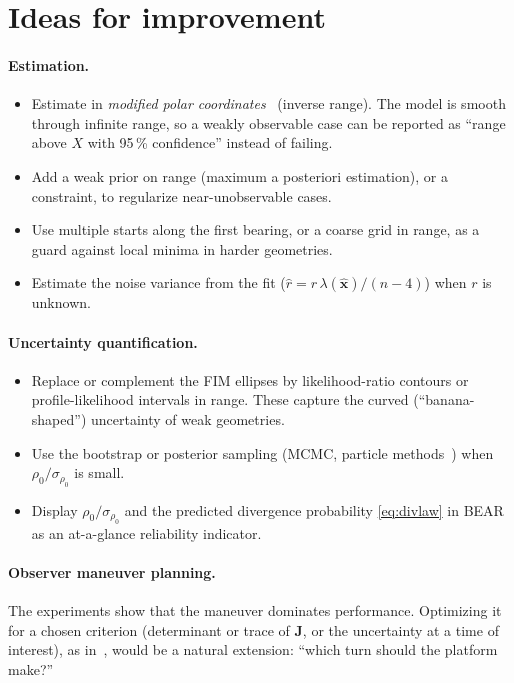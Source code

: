 \documentclass[11pt,a4paper]{article}
\newcommand{\xh}{\hat{\bm{x}}}
\newcommand{\J}{\bm{J}}
\theoremstyle{plain}
\theoremstyle{remark}
\begin{document}
\section{Ideas for improvement}
\label{sec:improvements}

\paragraph{Estimation.}
\begin{itemize}[nosep]
\item Estimate in \emph{modified polar coordinates}~\cite{aidala83} (inverse
  range). The model is smooth through infinite range, so a weakly observable
  case can be reported as ``range above $X$ with 95\,\% confidence'' instead
  of failing.
\item Add a weak prior on range (maximum a posteriori estimation), or a
  constraint, to regularize near-unobservable cases.
\item Use multiple starts along the first bearing, or a coarse grid in range,
  as a guard against local minima in harder geometries.
\item Estimate the noise variance from the fit
  ($\hat r = r\,\lambda(\xh)/(n-4)$) when $r$ is unknown.
\end{itemize}

\paragraph{Uncertainty quantification.}
\begin{itemize}[nosep]
\item Replace or complement the FIM ellipses by likelihood-ratio contours or
  profile-likelihood intervals in range. These capture the curved
  (``banana-shaped'') uncertainty of weak geometries.
\item Use the bootstrap or posterior sampling (MCMC, particle
  methods~\cite{ristic04}) when $\rho_0/\sigma_{\rho_0}$ is small.
\item Display $\rho_0/\sigma_{\rho_0}$ and the predicted divergence probability
  \cref{eq:divlaw} in BEAR as an at-a-glance reliability indicator.
\end{itemize}

\paragraph{Observer maneuver planning.} The experiments show that the
maneuver dominates performance. Optimizing it for a chosen criterion
(determinant or trace of $\J$, or the uncertainty at a time of interest), as
in~\cite{oshman99}, would be a natural extension: ``which turn should the
platform make?''
\end{document}
